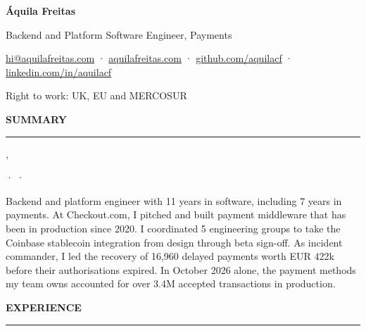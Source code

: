 \documentclass[10pt,a4paper]{article}
\newcommand{\cvtitlefont}{\fontsize{26.18}{31.42}\selectfont}
\newcommand{\cvsubtitlefont}{\fontsize{16.18}{19.42}\selectfont}
\newcommand{\cvsectionfont}{\fontsize{12.72}{15.26}\selectfont}
\newcommand{\cvrolefont}{\fontsize{11.28}{13.54}\selectfont}
\newcommand{\cvbodyfont}{\fontsize{10}{12}\selectfont}
\newcommand{\cvsecondaryfont}{\fontsize{9}{11}\selectfont}
\newcommand{\cvsection}[1]{%
	\par\vspace{8pt}%
	{\cvsectionfont\bfseries\MakeUppercase{#1}\par}\nopagebreak
	\vspace{2pt}\hrule\nopagebreak\vspace{4pt}%
}
\newenvironment{role}[5]{%
	\par\cvbodyfont
	\if\relax\detokenize{#1#3}\relax
	\else
		{\cvrolefont\mdseries {\bfseries #1}, #3\par}\nopagebreak
		{\cvsecondaryfont\if\relax\detokenize{#2}\relax\else #2 · \fi#4 · #5\par}\nopagebreak
		\vspace{2pt}%
	\fi
}{%
	\par\vspace{10pt}%
}
\begin{document}
\cvbodyfont


{\cvtitlefont\bfseries Áquila Freitas\par}
\vspace{4pt}
{\cvsubtitlefont Backend and Platform Software Engineer, Payments\par}
\vspace{5pt}
{\cvbodyfont \href{mailto:hi@aquilafreitas.com}{hi@aquilafreitas.com} · \href{https://aquilafreitas.com}{aquilafreitas.com} · \href{https://github.com/aquilacf}{github.com/aquilacf} · \href{https://linkedin.com/in/aquilacf}{linkedin.com/in/aquilacf}}\par
{\cvbodyfont Right to work: UK, EU and MERCOSUR}\par


\cvsection{Summary}

\begin{role}{}{}{}{}{}
Backend and platform engineer with 11 years in software, including 7 years in payments. At Checkout.com, I pitched and built payment middleware that has been in production since 2020. I coordinated 5 engineering groups to take the Coinbase stablecoin integration from design through beta sign-off. As incident commander, I led the recovery of 16,960 delayed payments worth EUR 422k before their authorisations expired. In October 2026 alone, the payment methods my team owns accounted for over 3.4M accepted transactions in production.
\end{role}


\cvsection{Experience}
\end{document}
